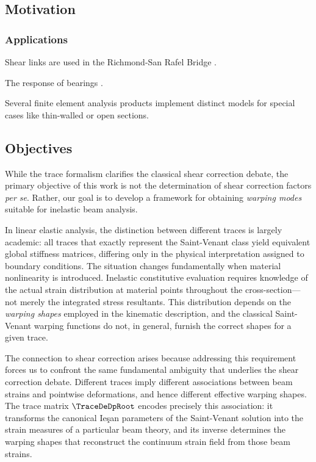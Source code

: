 
\subsection{Motivation}


\subsubsection{Applications}
Shear links are used in the Richmond-San Rafel Bridge \citep{seible2000long}.

The response of bearings \cite{montalto2024buckling,montalto2024effective}.

Several finite element analysis products implement distinct models for special cases like thin-walled or open sections.
\subsection{Objectives}

While the trace formalism clarifies the classical shear correction debate, the 
primary objective of this work is not the determination of shear correction 
factors \emph{per se}. Rather, our goal is to develop a framework for obtaining 
\emph{warping modes} suitable for inelastic beam analysis.

In linear elastic analysis, the distinction between different traces is 
largely academic: all traces that exactly represent the Saint-Venant class 
yield equivalent global stiffness matrices, differing only in the physical 
interpretation assigned to boundary conditions. The situation changes 
fundamentally when material nonlinearity is introduced. 
Inelastic constitutive 
evaluation requires knowledge of the actual strain distribution at material 
points throughout the cross-section—not merely the integrated stress 
resultants. This distribution depends on the \emph{warping shapes} employed 
in the kinematic description, and the classical Saint-Venant warping functions 
do not, in general, furnish the correct shapes for a given trace.

The connection to shear correction arises because addressing this requirement 
forces us to confront the same fundamental ambiguity that underlies the shear 
correction debate. Different traces imply different associations between 
beam strains and pointwise deformations, and hence different effective 
warping shapes. The trace matrix $\TraceDeDpRoot$ encodes precisely this 
association: it transforms the canonical Ie\c{s}an parameters of the 
Saint-Venant solution into the strain measures of a particular beam theory, 
and its inverse determines the warping shapes that reconstruct the continuum 
strain field from those beam strains.

